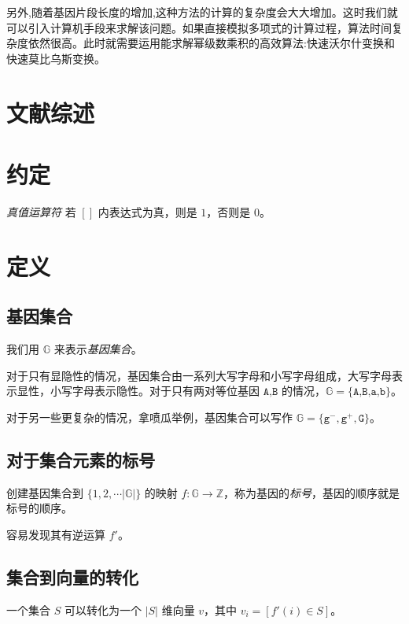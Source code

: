 \documentclass{article}
\begin{document}
另外,随着基因片段长度的增加,这种方法的计算的复杂度会大大增加。这时我们就可以引入计算机手段来求解该问题。如果直接模拟多项式的计算过程，算法时间复杂度依然很高。此时就需要运用能求解幂级数乘积的高效算法:快速沃尔什变换和快速莫比乌斯变换。


\section{文献综述}

\section{约定}

\textsl{真值运算符} \qquad 若 $[]$ 内表达式为真，则是 $1$，否则是 $0$。

\section{定义}


\subsection{基因集合}

我们用 $\mathbb{G}$ 来表示\textsl{基因集合}。

对于只有显隐性的情况，基因集合由一系列大写字母和小写字母组成，大写字母表示显性，小写字母表示隐性。对于只有两对等位基因 $\texttt{A,B}$ 的情况，$\mathbb{G}=\{\texttt{A,B,a,b}\}$。

对于另一些更复杂的情况，拿喷瓜举例，基因集合可以写作 $\mathbb{G}=\{\texttt{g}^{-},\texttt{g}^{+},\texttt{G}\}$。

\subsection{对于集合元素的标号}

创建基因集合到 $\{1,2,\cdots |\mathbb{G}|\}$ 的映射 $f:\mathbb{G} \to \mathbb{Z}$，称为基因的\textsl{标号}，基因的顺序就是标号的顺序。

容易发现其有逆运算 $f'$。

\subsection{集合到向量的转化}

一个集合 $S$ 可以转化为一个 $|S|$ 维向量 $v$，其中 $v_i=[f'(i) \in S]$。
\end{document}
